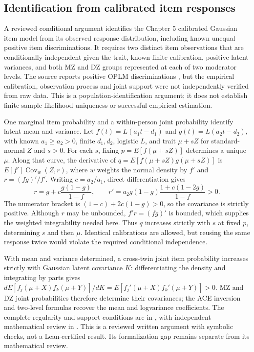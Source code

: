 \subsection{Identification from calibrated item responses}
A reviewed conditional argument identifies the Chapter 5 calibrated Gaussian item model from its observed response distribution, including known unequal positive item discriminations. It requires two distinct item observations that are conditionally independent given the trait, known finite calibration, positive latent variances, and both MZ and DZ groups represented at each of two moderator levels. The source reports positive OPLM discriminations \citep[p.\ 40]{schwabe2016}, but the empirical calibration, observation process and joint support were not independently verified from raw data. This is a population-identification argument; it does not establish finite-sample likelihood uniqueness or successful empirical estimation.

One marginal item probability and a within-person joint probability identify latent mean and variance. Let $f(t)=L(a_1t-d_1)$ and $g(t)=L(a_2t-d_2)$, with known $a_1\geq a_2>0$, finite $d_1,d_2$, logistic $L$, and trait $\mu+sZ$ for standard-normal $Z$ and $s>0$. For each $s$, fixing $p=E[f(\mu+sZ)]$ determines a unique $\mu$. Along that curve, the derivative of $q=E[f(\mu+sZ)g(\mu+sZ)]$ is $E[f']\operatorname{Cov}_w(Z,r)$, where $w$ weights the normal density by $f'$ and $r=(fg)'/f'$. Writing $c=a_2/a_1$, direct differentiation gives
\[
 r=g+c\frac{g(1-g)}{1-f},\qquad
 r'=a_2g(1-g)\frac{1+c(1-2g)}{1-f}>0.
\]
The numerator bracket is $(1-c)+2c(1-g)>0$, so the covariance is strictly positive. Although $r$ may be unbounded, $f'r=(fg)'$ is bounded, which supplies the weighted integrability needed here. Thus $q$ increases strictly with $s$ at fixed $p$, determining $s$ and then $\mu$. Identical calibrations are allowed, but reusing the same response twice would violate the required conditional independence.

With mean and variance determined, a cross-twin joint item probability increases strictly with Gaussian latent covariance $K$: differentiating the density and integrating by parts gives $dE[f_j(\mu+X)f_k(\mu+Y)]/dK=E[f_j'(\mu+X)f_k'(\mu+Y)]>0$. MZ and DZ joint probabilities therefore determine their covariances; the ACE inversion and two-level formulas recover the mean and logvariance coefficients. The complete regularity and support conditions are in , with independent mathematical review in . This is a reviewed written argument with symbolic checks, not a Lean-certified result. Its formalization gap remains separate from its mathematical review.

